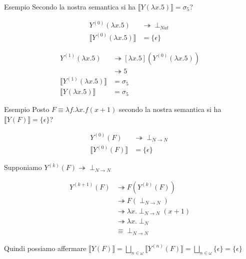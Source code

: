\documentclass{beamer}
\begin{document}
\begin{frame}

\begin{block}{Esempio}
	Secondo la nostra semantica si ha $\llbracket Y (\lambda x. 5) \rrbracket = \sigma_5$?
	
	\begin{align*}
		Y^{(0)}(\lambda x .5) & \twoheadrightarrow \perp_{Nat} \\
		\llbracket Y^{(0)}(\lambda x.5) \rrbracket & = \{ \epsilon \}
	\end{align*}
	
	\begin{align*}
		Y^{(1)}(\lambda x .5) & \twoheadrightarrow [\lambda x .5](Y^{(0)}(\lambda x .5)) \\
													& \twoheadrightarrow 5 \\
		\llbracket Y^{(1)}(\lambda x.5) \rrbracket & = \sigma_5 \\
		\llbracket Y(\lambda x.5) \rrbracket & = \sigma_5
	\end{align*}
	
	
\end{block}

\end{frame}

\begin{frame}


\begin{block}{Esempio}
	Posto $F \equiv \lambda f . \lambda x . f(x+1)$ secondo la nostra semantica si ha $\llbracket Y (F) \rrbracket = \{ \epsilon \}$?
	
	\begin{align*}
		Y^{(0)}(F) & \twoheadrightarrow \perp_{N \rightarrow N} \\
		\llbracket Y^{(0)}(F) \rrbracket & = \{ \epsilon \}
	\end{align*}
	
	Supponiamo $Y^{(k)}(F) \twoheadrightarrow \perp_{N \rightarrow N}$
	
	\begin{align*}
		Y^{(k+1)}(F) & \twoheadrightarrow F(Y^{(k)}(F)) \\
													& \twoheadrightarrow F(\perp_{N \rightarrow N}) \\
													& \twoheadrightarrow \lambda x.\perp_{N \rightarrow N}(x+1) \\
													& \twoheadrightarrow \lambda x.\perp_N \\
													& \equiv \perp_{N\rightarrow N}
		\end{align*}
	
	Quindi possiamo affermare $\llbracket Y(F) \rrbracket = \bigsqcup_{n\in \omega} \llbracket Y^{(n)}(F) \rrbracket = \bigsqcup_{n\in \omega} \{ \epsilon \} = \{ \epsilon \}$
	
\end{block}

\end{frame}
\end{document}
